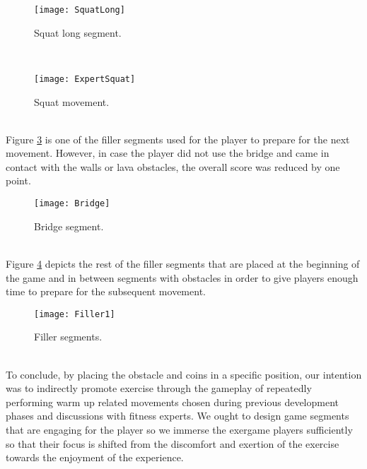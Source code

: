 \begin{figure}[h]
    \centering
    \texttt{[image: SquatLong]}
    \caption{Squat long segment.}
    \label{fig:squatlong}
\end{figure}\\
\begin{figure}[h]
    \centering
    \texttt{[image: ExpertSquat]}
    \caption{Squat movement.}
    \label{fig:squatlong}
\end{figure}\\
Figure \ref{fig:bridge} is one of the filler segments used for the player to prepare for the next movement. However, in case the player did not use the bridge and came in contact with the walls or lava obstacles, the overall score was reduced by one point.
\begin{figure}[h]
    \centering
    \texttt{[image: Bridge]}
    \caption{Bridge segment.}
    \label{fig:bridge}
\end{figure}\\
Figure \ref{fig:filler} depicts the rest of the filler segments that are placed at the beginning of the game and in between segments with obstacles in order to give players enough time to prepare for the subsequent movement.
\begin{figure}[h]
    \centering
    \texttt{[image: Filler1]}
    \caption{Filler segments.}
    \label{fig:filler}
\end{figure}\\
To conclude, by placing the obstacle and coins in a specific position, our intention was to indirectly promote exercise through the gameplay of repeatedly performing warm up related movements chosen during previous development phases and discussions with fitness experts. We ought to design game segments that are engaging for the player so we immerse the exergame players sufficiently so that their focus is shifted from the discomfort and exertion of the exercise towards the enjoyment of the experience.\pagebreak
